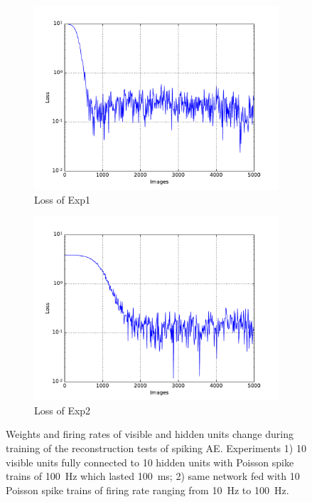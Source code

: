 \begin{figure}
\begin{subfigure}[t]{0.4\textwidth}
		\includegraphics[width=\textwidth]{pics_sdlm/05_exp_SAE_teach_long/exp1_mse_nons.pdf}
		\caption{Loss of Exp1}
	\end{subfigure}
	\begin{subfigure}[t]{0.4\textwidth}
		\includegraphics[width=\textwidth]{pics_sdlm/05_exp_SAE_teach_long/exp2_mse_nons.pdf}
		\caption{Loss of Exp2}
	\end{subfigure}
	\caption{Weights and firing rates of visible and hidden units change during training of the reconstruction tests of spiking AE. 
		Experiments 1) 10 visible units fully connected to 10 hidden units with Poisson spike trains of 100~Hz which lasted 100~ms; 2) same network fed with 10 Poisson spike trains of firing rate ranging from 10~Hz to 100~Hz.}
\end{figure}

